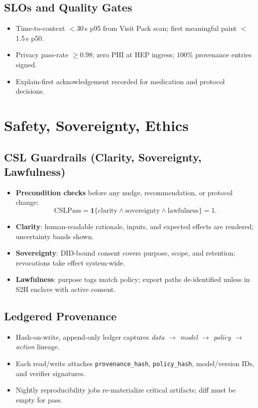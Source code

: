 \documentclass[11pt]{article}
\theoremstyle{plain}
\begin{document}
\subsection{SLOs and Quality Gates}
\begin{itemize}
  \item Time-to-context $<$30\,s p95 from Visit Pack scan; first meaningful paint $<$1.5\,s p50.
  \item Privacy pass-rate $\ge 0.98$; zero PHI at HEP ingress; $100\%$ provenance entries signed.
  \item Explain-first acknowledgement recorded for medication and protocol decisions.
\end{itemize}

\section{Safety, Sovereignty, Ethics}

\subsection{CSL Guardrails (Clarity, Sovereignty, Lawfulness)}
\begin{itemize}
  \item \textbf{Precondition checks} before any nudge, recommendation, or protocol change:
  \[
  \mathrm{CSLPass}=\mathbf{1}\{\mathrm{clarity}\wedge \mathrm{sovereignty}\wedge \mathrm{lawfulness}\}=1.
  \]
  \item \textbf{Clarity}: human-readable rationale, inputs, and expected effects are rendered; uncertainty bands shown.
  \item \textbf{Sovereignty}: DID-bound consent covers purpose, scope, and retention; revocations take effect system-wide.
  \item \textbf{Lawfulness}: purpose tags match policy; export paths de-identified unless in S2H enclave with active consent.
\end{itemize}

\subsection{Ledgered Provenance}
\begin{itemize}
  \item Hash-on-write, append-only ledger captures \emph{data $\rightarrow$ model $\rightarrow$ policy $\rightarrow$ action} lineage.
  \item Each read/write attaches \texttt{provenance\_hash}, \texttt{policy\_hash}, model/version IDs, and verifier signatures.
  \item Nightly reproducibility jobs re-materialize critical artifacts; diff must be empty for pass.
\end{itemize}
\end{document}
